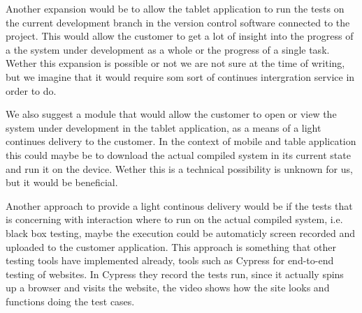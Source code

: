 Another expansion would be to allow the tablet application to run the tests on the current development branch in the version control software connected to the project.
This would allow the customer to get a lot of insight into the progress of a the system under development as a whole or the progress of a single task.
Wether this expansion is possible or not we are not sure at the time of writing, but we imagine that it would require som sort of continues intergration service in order to do.

We also suggest a module that would allow the customer to open or view the system under development in the tablet application, as a means of a light continues delivery to the customer.
In the context of mobile and table application this could maybe be to download the actual compiled system in its current state and run it on the device. 
Wether this is a technical possibility is unknown for us, but it would be beneficial.

Another approach to provide a light continous delivery would be if the tests that is concerning with interaction where to run on the actual compiled system, i.e. black box testing, maybe the execution could be automaticly screen recorded and uploaded to the customer application.
This approach is something that other testing tools have implemented already, tools such as Cypress for end-to-end testing of websites.
In Cypress they record the tests run, since it actually spins up a browser and visits the website, the video shows how the site looks and functions doing the test cases.